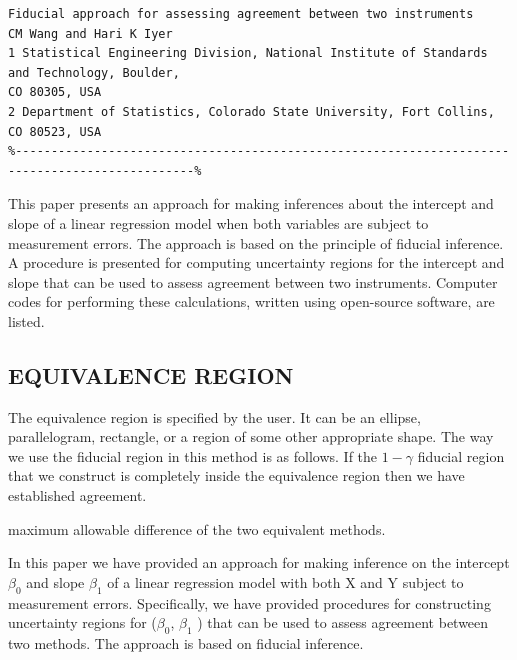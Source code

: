 \documentclass[MAIN.tex]{subfiles}
\begin{document}
\newpage
\begin{verbatim}
Fiducial approach for assessing agreement between two instruments
CM Wang and Hari K Iyer
1 Statistical Engineering Division, National Institute of Standards and Technology, Boulder,
CO 80305, USA
2 Department of Statistics, Colorado State University, Fort Collins, CO 80523, USA
%-----------------------------------------------------------------------------------------------%
\end{verbatim}
This paper presents an approach for making inferences about the intercept and slope of a linear
regression model when both variables are subject to measurement errors. The approach is
based on the principle of fiducial inference. A procedure is presented for computing
uncertainty regions for the intercept and slope that can be used to assess agreement between
two instruments. Computer codes for performing these calculations, written using open-source
software, are listed.

\subsection*{EQUIVALENCE REGION}
The equivalence region is specified by the user. It can be an ellipse, parallelogram,
rectangle, or a region of some other appropriate shape. The way we use the fiducial region in this method is as follows. If
the $1−\gamma$ fiducial region that we construct is completely inside the equivalence region then we have established agreement.

maximum allowable difference of the two equivalent methods.

In this paper we have provided an approach for making inference on the intercept $\beta_0$ and slope $\beta_1$ of a linear regression
model with both X and Y subject to measurement errors. Specifically, we have provided procedures for constructing
uncertainty regions for ($\beta_0$, $\beta_1$ ) that can be used to assess agreement between two methods. The approach is based on
fiducial inference.



\end{document}
